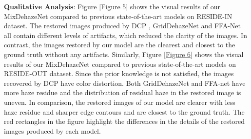 \documentclass[10pt,twocolumn,letterpaper]{article}
\begin{document}
\textbf{Qualitative Analysis}: Figure \ref{Figure 5} shows the visual results of our MixDehazeNet compared to previous state-of-the-art models on RESIDE-IN dataset. The restored images produced by DCP \cite{DCPDN}, GridDehazeNet \cite{Griddehazenet} and FFA-Net \cite{qin2020ffa} all contain different levels of artifacts, which reduced the clarity of the images. In contrast, the images restored by our model are the clearest and closest to the ground truth without any artifacts. Similarly, Figure \ref{Figure 6} shows the visual results of our MixDehazeNet compared to previous state-of-the-art models on RESIDE-OUT dataset. Since the prior knowledge is not satisfied, the images recovered by DCP \cite{DCPDN} have color distortion. Both GridDehazeNet \cite{Griddehazenet} and FFA-net \cite{qin2020ffa} have more haze residue and the distribution of residual haze in the restored image is uneven. In comparison, the restored images of our model are clearer with less haze residue and sharper edge contours and are closest to the ground truth. The red rectangles in the figure highlight the differences in the details of the restored images produced by each model.

\begin{table}[t]
\renewcommand\arraystretch{1.5}
\centering
\caption{\centering Model Architecture Detailed.}
\label{Table 2}
\end{table}
\end{document}
